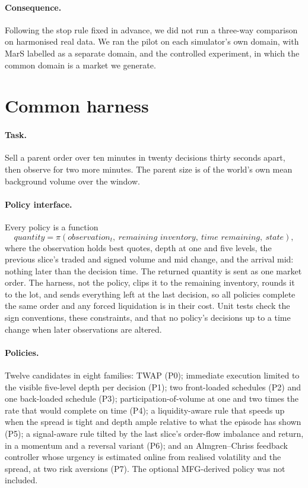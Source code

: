 \paragraph{Consequence.} Following the stop rule fixed in advance, we did not run a three-way comparison on harmonised real data. We ran the pilot on each simulator's own domain, with MarS labelled as a separate domain, and the controlled experiment, in which the common domain is a market we generate.

\section{Common harness}
\label{sec:harness}

\paragraph{Task.} Sell a parent order over ten minutes in twenty decisions thirty seconds apart, then observe for two more minutes. The parent size is \sizesText{} of the world's own mean background volume over the window.

\paragraph{Policy interface.} Every policy is a function
\[
\textit{quantity} = \pi(\textit{observation}_t,\ \textit{remaining inventory},\ \textit{time remaining},\ \textit{state}),
\]
where the observation holds best quotes, depth at one and five levels, the previous slice's traded and signed volume and mid change, and the arrival mid: nothing later than the decision time. The returned quantity is sent as one market order. The harness, not the policy, clips it to the remaining inventory, rounds it to the lot, and sends everything left at the last decision, so all policies complete the same order and any forced liquidation is in their cost. Unit tests check the sign conventions, these constraints, and that no policy's decisions up to a time change when later observations are altered.

\paragraph{Policies.} Twelve candidates in eight families: TWAP (P0); immediate execution limited to the visible five-level depth per decision (P1); two front-loaded schedules (P2) and one back-loaded schedule (P3); participation-of-volume at one and two times the rate that would complete on time (P4); a liquidity-aware rule that speeds up when the spread is tight and depth ample relative to what the episode has shown (P5); a signal-aware rule tilted by the last slice's order-flow imbalance and return, in a momentum and a reversal variant (P6); and an Almgren--Chriss feedback controller whose urgency is estimated online from realised volatility and the spread, at two risk aversions (P7). The optional MFG-derived policy was not included.


